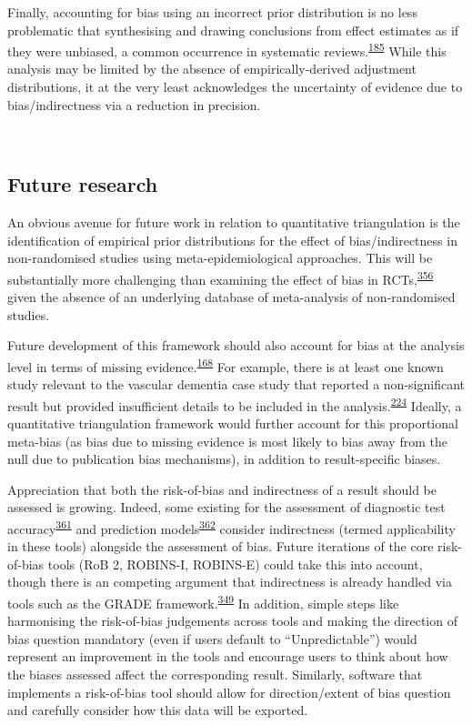\documentclass[a4paper, twoside]{templates/ociamthesis}
\begin{document}
Finally, accounting for bias using an incorrect prior distribution is no less problematic that synthesising and drawing conclusions from effect estimates as if they were unbiased, a common occurrence in systematic reviews.\textsuperscript{\protect\hyperlink{ref-katikireddi2015}{185}} While this analysis may be limited by the absence of empirically-derived adjustment distributions, it at the very least acknowledges the uncertainty of evidence due to bias/indirectness via a reduction in precision.

~

\newpage

\hypertarget{future-research}{%
\subsection{Future research}\label{future-research}}

An obvious avenue for future work in relation to quantitative triangulation is the identification of empirical prior distributions for the effect of bias/indirectness in non-randomised studies using meta-epidemiological approaches. This will be substantially more challenging than examining the effect of bias in RCTs,\textsuperscript{\protect\hyperlink{ref-savovic2018}{356}} given the absence of an underlying database of meta-analysis of non-randomised studies.

Future development of this framework should also account for bias at the analysis level in terms of missing evidence.\textsuperscript{\protect\hyperlink{ref-zotero-15123}{168}} For example, there is at least one known study relevant to the vascular dementia case study that reported a non-significant result but provided insufficient details to be included in the analysis.\textsuperscript{\protect\hyperlink{ref-chiang2007}{224}} Ideally, a quantitative triangulation framework would further account for this proportional meta-bias (as bias due to missing evidence is most likely to bias away from the null due to publication bias mechanisms), in addition to result-specific biases.

Appreciation that both the risk-of-bias and indirectness of a result should be assessed is growing. Indeed, some existing for the assessment of diagnostic test accuracy\textsuperscript{\protect\hyperlink{ref-whiting2011}{361}} and prediction models\textsuperscript{\protect\hyperlink{ref-moons2019}{362}} consider indirectness (termed applicability in these tools) alongside the assessment of bias. Future iterations of the core risk-of-bias tools (RoB 2, ROBINS-I, ROBINS-E) could take this into account, though there is an competing argument that indirectness is already handled via tools such as the GRADE framework.\textsuperscript{\protect\hyperlink{ref-guyatt2011}{349}} In addition, simple steps like harmonising the risk-of-bias judgements across tools and making the direction of bias question mandatory (even if users default to ``Unpredictable'') would represent an improvement in the tools and encourage users to think about how the biases assessed affect the corresponding result. Similarly, software that implements a risk-of-bias tool should allow for direction/extent of bias question and carefully consider how this data will be exported.
\end{document}
